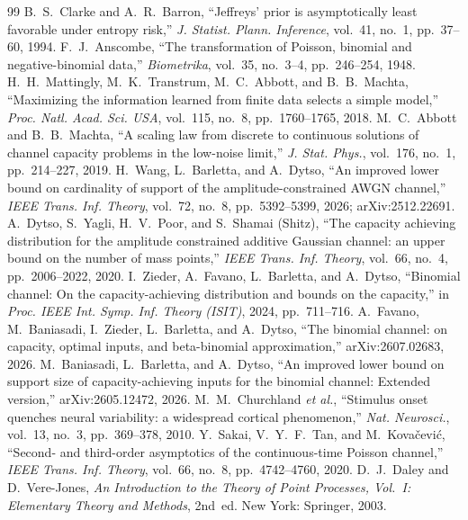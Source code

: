 \documentclass[journal]{IEEEtran}
\begin{document}
\begin{thebibliography}{99}
 B.~S.~Clarke and A.~R.~Barron, ``Jeffreys' prior is asymptotically least favorable under entropy risk,'' \emph{J. Statist. Plann. Inference}, vol.~41, no.~1, pp.~37--60, 1994.
 F.~J.~Anscombe, ``The transformation of Poisson, binomial and negative-binomial data,'' \emph{Biometrika}, vol.~35, no.~3--4, pp.~246--254, 1948.
 H.~H.~Mattingly, M.~K.~Transtrum, M.~C.~Abbott, and B.~B.~Machta, ``Maximizing the information learned from finite data selects a simple model,'' \emph{Proc. Natl. Acad. Sci. USA}, vol.~115, no.~8, pp.~1760--1765, 2018.
 M.~C.~Abbott and B.~B.~Machta, ``A scaling law from discrete to continuous solutions of channel capacity problems in the low-noise limit,'' \emph{J. Stat. Phys.}, vol.~176, no.~1, pp.~214--227, 2019.
 H.~Wang, L.~Barletta, and A.~Dytso, ``An improved lower bound on cardinality of support of the amplitude-constrained AWGN channel,'' \emph{IEEE Trans. Inf. Theory}, vol.~72, no.~8, pp.~5392--5399, 2026; arXiv:2512.22691.%
 A.~Dytso, S.~Yagli, H.~V.~Poor, and S.~Shamai (Shitz), ``The capacity achieving distribution for the amplitude constrained additive Gaussian channel: an upper bound on the number of mass points,'' \emph{IEEE Trans. Inf. Theory}, vol.~66, no.~4, pp.~2006--2022, 2020.
 I.~Zieder, A.~Favano, L.~Barletta, and A.~Dytso, ``Binomial channel: On the capacity-achieving distribution and bounds on the capacity,'' in \emph{Proc. IEEE Int. Symp. Inf. Theory (ISIT)}, 2024, pp.~711--716.
 A.~Favano, M.~Baniasadi, I.~Zieder, L.~Barletta, and A.~Dytso, ``The binomial channel: on capacity, optimal inputs, and beta-binomial approximation,'' arXiv:2607.02683, 2026.
 M.~Baniasadi, L.~Barletta, and A.~Dytso, ``An improved lower bound on support size of capacity-achieving inputs for the binomial channel: Extended version,'' arXiv:2605.12472, 2026.
 M.~M.~Churchland \emph{et al.}, ``Stimulus onset quenches neural variability: a widespread cortical phenomenon,'' \emph{Nat. Neurosci.}, vol.~13, no.~3, pp.~369--378, 2010.%
 Y.~Sakai, V.~Y.~F.~Tan, and M.~Kova\v{c}evi\'c, ``Second- and third-order asymptotics of the continuous-time Poisson channel,'' \emph{IEEE Trans. Inf. Theory}, vol.~66, no.~8, pp.~4742--4760, 2020.%
 D.~J.~Daley and D.~Vere-Jones, \emph{An Introduction to the Theory of Point Processes, Vol.~I: Elementary Theory and Methods}, 2nd~ed. New York: Springer, 2003.%

\end{thebibliography}
\end{document}
